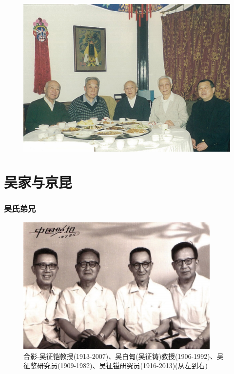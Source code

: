 \documentclass[cjk,slidestop,compress,mathserif,blue]{beamer}
\begin{document}
\frame
{
	\frametitle{}
\begin{figure}[h!]
\centering
\includegraphics[height=0.60\textwidth,width=1.0\textwidth,viewport=0 0 500 300,clip]{Figures/Collect_Zhu-Liu-Wu-Wang.jpg}
\caption{\fontsize{7.3pt}{3.9pt}}
\label{Collect_Wang}
\end{figure}
}

\section{吴家与京昆}
\frame
{
	\frametitle{吴氏弟兄}
\begin{figure}[h!]
\centering
\vspace{-10.5pt}
\includegraphics[height=0.52\textwidth,width=0.9\textwidth,viewport=0 0 225 140,clip]{Figures/Collect_Wus-1.jpg}
\caption{合影-吴征铠教授(1913-2007)、吴白匋(吴征铸)教授(1906-1992)、吴征鉴研究员(1909-1982)、吴征镒研究员(1916-2013)(从左到右)}
\label{Collect_Wu_s-1}
\end{figure}
}
\end{document}
